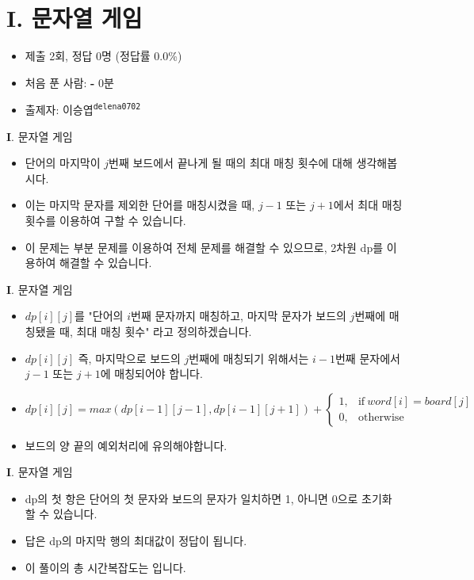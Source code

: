 \section{I. 문자열 게임}

\begin{frame} %
    \begin{itemize}
    	\item 제출 2회, 정답 0명 (정답률 0.0\%)
    	\item 처음 푼 사람: \textbf{-} 0분
        \item 출제자: 이승엽\textsuperscript{\color{kupc-gray}\texttt{delena0702}}
    \end{itemize}
\end{frame}

\begin{frame}{\textbf{I}. 문자열 게임}
\begin{itemize}
	\item 단어의 마지막이 $j$번째 보드에서 끝나게 될 때의 최대 매칭 횟수에 대해 생각해봅시다.
	\item 이는 마지막 문자를 제외한 단어를 매칭시켰을 때, $j - 1$ 또는 $j + 1$에서 최대 매칭 횟수를 이용하여 구할 수 있습니다.
	\item 이 문제는 부분 문제를 이용하여 전체 문제를 해결할 수 있으므로, 2차원 dp를 이용하여 해결할 수 있습니다.
\end{itemize}
\end{frame}

\begin{frame}{\textbf{I}. 문자열 게임}
	\begin{itemize}
		\item $dp[i][j]$를 "단어의 $i$번째 문자까지 매칭하고, 마지막 문자가 보드의 $j$번째에 매칭됐을 때, 최대 매칭 횟수" 라고 정의하겠습니다.
		\item $dp[i][j]$ 즉, 마지막으로 보드의 $j$번째에 매칭되기 위해서는 $i - 1$번째 문자에서 $j - 1$ 또는 $j + 1$에 매칭되어야 합니다.
		\item $dp[i][j] = max(dp[i - 1][j - 1], dp[i - 1][j + 1]) + \begin{cases}
			1, & \text{if}\ word[i] = board[j] \\
			0, & \text{otherwise}
		\end{cases} $
		\item 보드의 양 끝의 예외처리에 유의해야합니다.
	\end{itemize}
\end{frame}

\begin{frame}{\textbf{I}. 문자열 게임}
	\begin{itemize}
		\item dp의 첫 항은 단어의 첫 문자와 보드의 문자가 일치하면 1, 아니면 0으로 초기화 할 수 있습니다.
		\item 답은 dp의 마지막 행의 최대값이 정답이 됩니다.
		\item 이 풀이의 총 시간복잡도는 입니다.
	\end{itemize}
\end{frame}